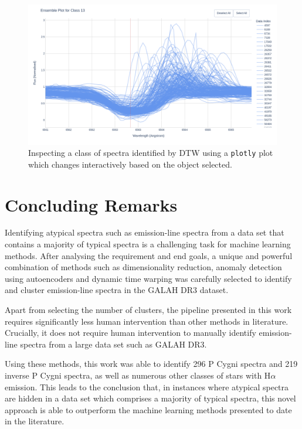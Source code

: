\begin{figure}[!htb]
\centering
\includegraphics[scale=0.38]{figures/plotly image.png}
\caption{Inspecting a class of spectra identified by DTW using a \texttt{plotly} plot which changes interactively based on the object selected.}
\end{figure}

\section{Concluding Remarks}

Identifying atypical spectra such as emission-line spectra from a data set that contains a majority of typical spectra is a challenging task for machine learning methods. After analysing the requirement and end goals, a unique and powerful combination of methods such as dimensionality reduction, anomaly detection using autoencoders and dynamic time warping was  carefully selected to identify and cluster emission-line spectra in the GALAH DR3 dataset. 

Apart from selecting the number of clusters, the pipeline presented in this work requires significantly less human intervention than other methods in literature. Crucially, it does not require human intervention to manually identify emission-line spectra from a large data set such as GALAH DR3. 

Using these methods, this work was able to identify 296 P Cygni spectra and 219 inverse P Cygni spectra, as well as numerous other classes of stars with H$\alpha$ emission. This leads to the conclusion that, in instances where atypical spectra are hidden in a data set which comprises a majority of typical spectra, this novel approach is able to outperform the machine learning methods presented to date in the literature. 







